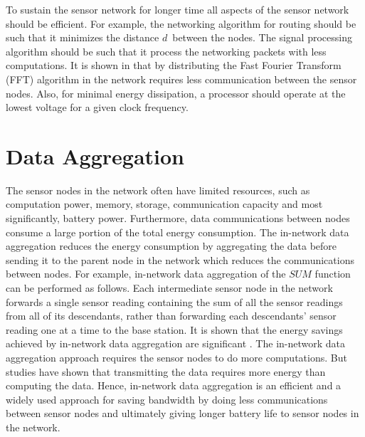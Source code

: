  	To sustain the sensor network for longer time all aspects of the sensor network should be efficient.
	For example, the networking algorithm for routing should be such that it minimizes the distance $d$\ between the nodes.
	The signal processing algorithm should be such that it process the networking packets with less computations.
	It is shown in \cite{wang2002energy} that by distributing the Fast Fourier Transform (FFT) algorithm in the network requires less communication between the sensor nodes.
	Also, for minimal energy dissipation, a processor should operate at the lowest voltage for a given clock frequency.

\section{Data Aggregation}
	The sensor nodes in the network often have limited resources, such as computation power, memory, storage, communication capacity and most significantly, battery power.
	Furthermore, data communications between nodes consume a large portion of the total energy consumption. 
	The in-network data aggregation reduces the energy consumption by aggregating the data before sending it to the parent node in the network which reduces the communications between nodes.
	For example, in-network data aggregation of the $\textit{SUM}$ function can be performed as follows. 
	Each intermediate sensor node in the network forwards a single sensor reading containing the sum of all the sensor readings from all of its descendants, rather than forwarding each descendants' sensor reading one at a time to the base station.
	It is shown that the energy savings achieved by in-network data aggregation are significant \cite{madden2002tag}.
	The in-network data aggregation approach requires the sensor nodes to do more computations.
	But studies have shown that transmitting the data requires more energy than computing the data. 
	Hence, in-network data aggregation is an efficient and a widely used approach for saving bandwidth by doing less communications between sensor nodes and ultimately giving longer battery life to sensor nodes in the network.


